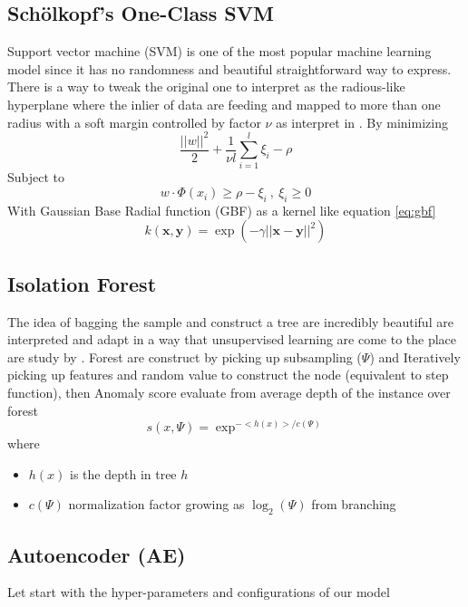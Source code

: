 \subsection{Sch\"{o}lkopf's One-Class SVM}
Support vector machine (SVM) is one of the most popular machine learning model since it has no randomness and beautiful straightforward way to express.
There is a way to tweak the original one to interpret as the radious-like hyperplane where the inlier of data are feeding and mapped to more than one radius with a soft margin controlled by factor $\nu$ as interpret in \cite{oneclasssvm}.
By minimizing
\begin{equation}
\frac{||w||^2}{2} + \frac{1}{\nu l}\sum_{i=1}^l \xi_i - \rho
\end{equation}
Subject to
\begin{equation}
    w \cdot \Phi(x_i) \geqslant \rho - \xi_i \ ,\ \xi_i \geqslant 0
\end{equation}
With Gaussian Base Radial function (GBF) as a kernel like equation \ref{eq:gbf}
\begin{equation}\label{eq:gbf}
    k(\mathbf{x}, \mathbf{y}) = \exp(-\gamma||\mathbf{x} - \mathbf{y}||^2)
\end{equation}

\subsection{Isolation Forest}
The idea of bagging the sample and construct a tree are incredibly beautiful are interpreted and adapt in a way that unsupervised learning are come to the place are study by \cite{isolation_forest}.
Forest are construct by picking up subsampling ($\Psi$) and Iteratively picking up features and random value to construct the node (equivalent to step function), then Anomaly score evaluate from average depth of the instance over forest
\begin{equation}
    s(x, \Psi) = \exp^{-<h(x)>/c(\Psi)}
\end{equation} 
where
\begin{itemize}
    \item $h(x)$ is the depth in tree $h$
    \item $c(\Psi)$ normalization factor growing as $\log_2(\Psi)$ from branching
\end{itemize}

\subsection{Autoencoder (AE)}
Let start with the hyper-parameters and configurations of our model
